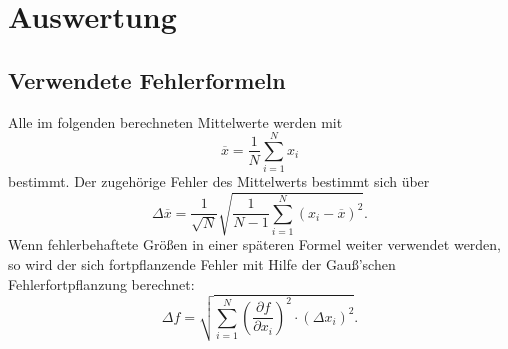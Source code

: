 \section{Auswertung}
\label{sec:Auswertung}
\subsection{Verwendete Fehlerformeln}
Alle im folgenden berechneten Mittelwerte werden mit
\begin{equation}
	\label{eqn:mittelwert}
	\overline x=\frac{1}{N}\sum \limits_{i=1}^{N} x_i
\end{equation}
bestimmt.
Der zugehörige Fehler des Mittelwerts bestimmt sich über
\begin{equation}
	\label{eqn:mittelwertfehler}
	\Delta \overline x= \frac{1}{\sqrt{N}} \sqrt{\frac{1}{N-1} \sum \limits_{i=1}^{N} (x_i- \overline x)^2}\text{.}
\end{equation}
Wenn fehlerbehaftete Größen in einer späteren Formel weiter verwendet werden, so wird der sich fortpflanzende Fehler
mit Hilfe der Gauß’schen Fehlerfortpflanzung berechnet:
\begin{equation}
	\label{eqn:fehlerfortpflanzung}
	\Delta f = \sqrt{ \sum \limits_{i = 1}^{N} (\frac{\partial f}{\partial x_i})^2 \cdot (\Delta x_i)^2}\text{.}
\end{equation}
\FloatBarrier

